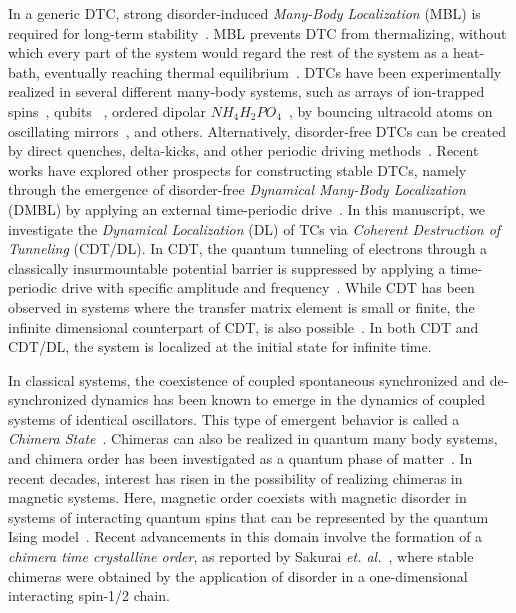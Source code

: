 \documentclass[%
nofootinbib,
reprint,
superscriptaddress,
amsmath,amssymb,showkeys,
aps,
prb,
]{revtex4-2}
\begin{document}
	In a generic DTC, strong disorder-induced \textit{Many-Body Localization} (MBL) is required for long-term stability~\cite{zhang_observation_2017}. MBL prevents DTC from thermalizing, without which every part of the system
	would regard the rest of the system as a heat-bath, eventually reaching thermal equilibrium~\cite{alet_many-body_2018,else_floquet_2016,smith_many-body_2016,nguyen_signature_2021}.  DTCs have been experimentally realized in several different many-body systems, such as arrays of ion-trapped spins~\cite{huang2018,taheri_all-optical_2022, Soham2018, zhang_observation_2017, yao_time_2018,sacha_modeling_2015}, qubits ~\cite{frey_realization_2022}, ordered dipolar $NH_4H_2PO_4$~\cite{rovny_observation_2018}, by bouncing ultracold atoms on oscillating mirrors~\cite{sacha_time_nodate,golletz_basis_2022}, and others. Alternatively, disorder-free DTCs can be created by direct quenches, delta-kicks, and other periodic driving methods~\cite{else_prethermal_2017, russomanno_spin_2017, ho_critical_2017, yu2019, russomanno_floquet_2017}.  Recent works have explored other prospects for constructing stable DTCs, namely through the emergence of disorder-free \textit{Dynamical Many-Body Localization} (DMBL)  by applying an external time-periodic drive~\cite{Keser2016, haldar_dynamical_2017, haldar_dynamical_2021,bhattacharyya_transverse_2012,aditya2023dynamical,dutta2014,das_exotic_2010}. In this manuscript, we investigate the \textit{Dynamical Localization} (DL) of TCs via \textit{Coherent Destruction of Tunneling} (CDT/DL). In CDT, the quantum tunneling of electrons through a classically insurmountable potential barrier is suppressed by applying a time-periodic drive with specific amplitude and frequency~\cite{Grossmann1991, Ashhab2007}. While CDT has been observed in systems where the transfer matrix element is small or finite,  the infinite dimensional counterpart of CDT, is also possible~\cite{das_exotic_2010, Roy2015}. In both CDT and CDT/DL, the system is localized at the initial state for infinite time\cite{Kayanuma2008}.
	
	In classical systems, the coexistence of coupled spontaneous synchronized and de-synchronized  dynamics has been known to emerge in the dynamics of coupled systems of identical oscillators. This type of emergent behavior is called a \textit{Chimera State}~\cite{kuramoto_coexistence_2002, panaggio_chimera_2015, parastesh_chimeras_2021}. Chimeras can also be realized in quantum many body systems, and chimera order has been investigated as a quantum phase of matter~\cite{bastidas_quantum_2015}. In recent decades, interest has risen in the possibility of realizing chimeras in magnetic systems. Here, magnetic order coexists with magnetic disorder in systems of interacting quantum spins that can be represented by the quantum Ising model~\cite{singh_chimera_2011}.  Recent advancements in this domain involve the formation of a \textit{chimera time crystalline order}, as reported by Sakurai \textit{et. al.}~\cite{sakurai_phys_nodate}, where stable chimeras were obtained by the application of disorder in a one-dimensional interacting spin-1/2 chain.
	
\end{document}
